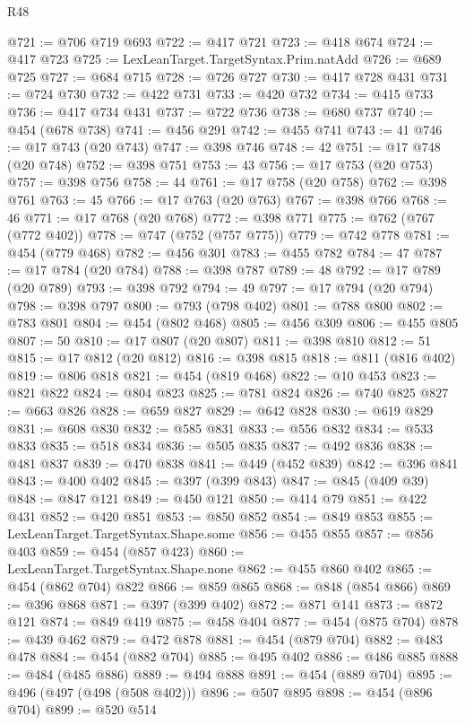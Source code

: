 \begin{lexlean}{R48}
\begin{coremodule}
@721 := @706 @719 @693
@722 := @417 @721
@723 := @418 @674
@724 := @417 @723
@725 := LexLeanTarget.TargetSyntax.Prim.natAdd
@726 := @689 @725
@727 := @684 @715
@728 := @726 @727
@730 := @417 @728 @431
@731 := @724 @730
@732 := @422 @731
@733 := @420 @732
@734 := @415 @733
@736 := @417 @734 @431
@737 := @722 @736
@738 := @680 @737
@740 := @454 (@678 @738)
@741 := @456 @291
@742 := @455 @741
@743 := 41
@746 := @17 @743 (@20 @743)
@747 := @398 @746
@748 := 42
@751 := @17 @748 (@20 @748)
@752 := @398 @751
@753 := 43
@756 := @17 @753 (@20 @753)
@757 := @398 @756
@758 := 44
@761 := @17 @758 (@20 @758)
@762 := @398 @761
@763 := 45
@766 := @17 @763 (@20 @763)
@767 := @398 @766
@768 := 46
@771 := @17 @768 (@20 @768)
@772 := @398 @771
@775 := @762 (@767 (@772 @402))
@778 := @747 (@752 (@757 @775))
@779 := @742 @778
@781 := @454 (@779 @468)
@782 := @456 @301
@783 := @455 @782
@784 := 47
@787 := @17 @784 (@20 @784)
@788 := @398 @787
@789 := 48
@792 := @17 @789 (@20 @789)
@793 := @398 @792
@794 := 49
@797 := @17 @794 (@20 @794)
@798 := @398 @797
@800 := @793 (@798 @402)
@801 := @788 @800
@802 := @783 @801
@804 := @454 (@802 @468)
@805 := @456 @309
@806 := @455 @805
@807 := 50
@810 := @17 @807 (@20 @807)
@811 := @398 @810
@812 := 51
@815 := @17 @812 (@20 @812)
@816 := @398 @815
@818 := @811 (@816 @402)
@819 := @806 @818
@821 := @454 (@819 @468)
@822 := @10 @453
@823 := @821 @822
@824 := @804 @823
@825 := @781 @824
@826 := @740 @825
@827 := @663 @826
@828 := @659 @827
@829 := @642 @828
@830 := @619 @829
@831 := @608 @830
@832 := @585 @831
@833 := @556 @832
@834 := @533 @833
@835 := @518 @834
@836 := @505 @835
@837 := @492 @836
@838 := @481 @837
@839 := @470 @838
@841 := @449 (@452 @839)
@842 := @396 @841
@843 := @400 @402
@845 := @397 (@399 @843)
@847 := @845 (@409 @39)
@848 := @847 @121
@849 := @450 @121
@850 := @414 @79
@851 := @422 @431
@852 := @420 @851
@853 := @850 @852
@854 := @849 @853
@855 := LexLeanTarget.TargetSyntax.Shape.some
@856 := @455 @855
@857 := @856 @403
@859 := @454 (@857 @423)
@860 := LexLeanTarget.TargetSyntax.Shape.none
@862 := @455 @860 @402
@865 := @454 (@862 @704) @822
@866 := @859 @865
@868 := @848 (@854 @866)
@869 := @396 @868
@871 := @397 (@399 @402)
@872 := @871 @141
@873 := @872 @121
@874 := @849 @419
@875 := @458 @404
@877 := @454 (@875 @704)
@878 := @439 @462
@879 := @472 @878
@881 := @454 (@879 @704)
@882 := @483 @478
@884 := @454 (@882 @704)
@885 := @495 @402
@886 := @486 @885
@888 := @484 (@485 @886)
@889 := @494 @888
@891 := @454 (@889 @704)
@895 := @496 (@497 (@498 (@508 @402)))
@896 := @507 @895
@898 := @454 (@896 @704)
@899 := @520 @514

\end{coremodule}
\end{lexlean}

